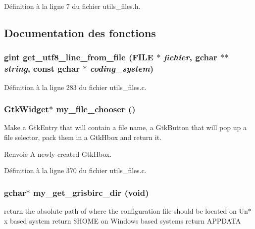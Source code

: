 Définition à la ligne 7 du fichier utils\_\-files.h.



\subsection{Documentation des fonctions}
\subsubsection[{get\_\-utf8\_\-line\_\-from\_\-file}]{\setlength{\rightskip}{0pt plus 5cm}gint get\_\-utf8\_\-line\_\-from\_\-file (FILE $\ast$ {\em fichier}, \/  gchar $\ast$$\ast$ {\em string}, \/  const gchar $\ast$ {\em coding\_\-system})}\label{utils__files_8h_a3a8b0bb721fc3468001ca2ea9e9d17a0}


Définition à la ligne 283 du fichier utils\_\-files.c.

\subsubsection[{my\_\-file\_\-chooser}]{\setlength{\rightskip}{0pt plus 5cm}GtkWidget$\ast$ my\_\-file\_\-chooser ()}\label{utils__files_8h_ad180bc31f9d0e255a0e6e1a0a05a7d82}
Make a GtkEntry that will contain a file name, a GtkButton that will pop up a file selector, pack them in a GtkHbox and return it.

\begin{DoxyReturn}{Renvoie}
A newly created GtkHbox. 
\end{DoxyReturn}


Définition à la ligne 370 du fichier utils\_\-files.c.

\subsubsection[{my\_\-get\_\-grisbirc\_\-dir}]{\setlength{\rightskip}{0pt plus 5cm}gchar$\ast$ my\_\-get\_\-grisbirc\_\-dir (void)}\label{utils__files_8h_a1a062adbff317c16f4e4930090068dd3}
return the absolute path of where the configuration file should be located on Un$\ast$x based system return \$HOME on Windows based systems return APPDATA

